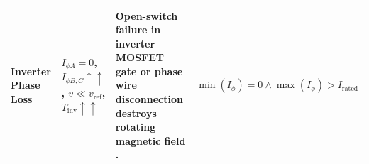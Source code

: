 \begin{table}[htbp]
\begin{tabular}{p{2.8cm}p{3.5cm}p{4.2cm}p{4.0cm}}
\addlinespace
\textbf{Inverter Phase Loss} & $I_{\phi A} = 0$, $I_{\phi B,C} \uparrow\uparrow$, $v \ll v_{\mathrm{ref}}$, $T_{\mathrm{inv}} \uparrow\uparrow$ & Open-switch failure in inverter MOSFET gate or phase wire disconnection destroys rotating magnetic field \cite{Pillai2024Taxonomy, Li2023Prognostics}. & $\min(I_\phi) = 0 \land \max(I_\phi) > I_{\mathrm{rated}}$ \\
\bottomrule
\end{tabular}
\end{table}
